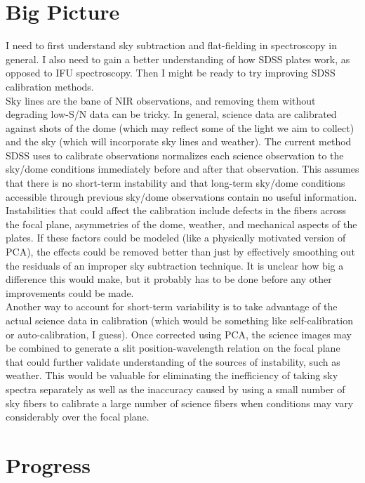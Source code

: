 \documentclass[12pt]{article}
\begin{document}
\section*{Big Picture}
I need to first understand sky subtraction and flat-fielding in spectroscopy in general.  I also need to gain a better understanding of how SDSS plates work, as opposed to IFU spectroscopy.  Then I might be ready to try improving SDSS calibration methods.\\
\indent Sky lines are the bane of NIR observations, and removing them without degrading low-S/N data can be tricky.  In general, science data are calibrated against shots of the dome (which may reflect some of the light we aim to collect) and the sky (which will incorporate sky lines and weather).  The current method SDSS uses to calibrate observations normalizes each science observation to the sky/dome conditions immediately before and after that observation.  This assumes that there is no short-term instability and that long-term sky/dome conditions accessible through previous sky/dome observations contain no useful information.\\
\indent Instabilities that could affect the calibration include defects in the fibers across the focal plane, asymmetries of the dome, weather, and mechanical aspects of the plates.  If these factors could be modeled (like a physically motivated version of PCA), the effects could be removed better than just by effectively smoothing out the residuals of an improper sky subtraction technique.  It is unclear how big a difference this would make, but it probably has to be done before any other improvements could be made.\\
\indent Another way to account for short-term variability is to take advantage of the actual science data in calibration (which would be something like self-calibration or auto-calibration, I guess).  Once corrected using PCA, the science images may be combined to generate a slit position-wavelength relation on the focal plane that could further validate understanding of the sources of instability, such as weather.  This would be valuable for eliminating the inefficiency of taking sky spectra separately as well as the inaccuracy caused by using a small number of sky fibers to calibrate a large number of science fibers when conditions may vary considerably over the focal plane.
\section*{Progress}
\end{document}

